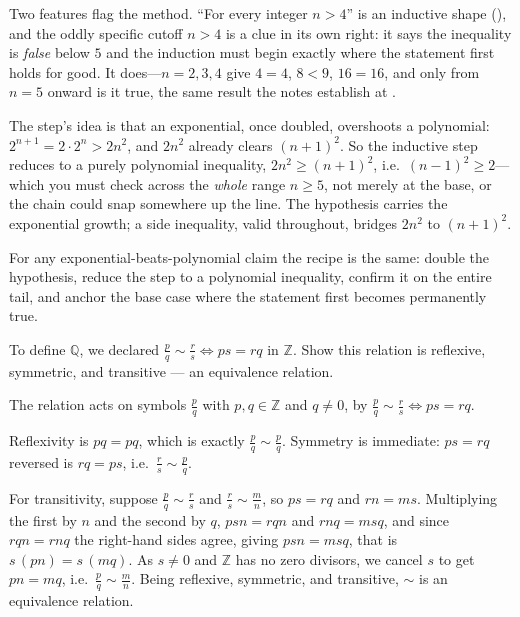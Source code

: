 \documentclass[main.tex]{subfiles}
\begin{document}
\begin{Reflection}
Two features flag the method. ``For every integer $n>4$'' is an inductive shape (), and
the oddly specific cutoff $n>4$ is a clue in its own right: it says the inequality is \emph{false}
below $5$ and the induction must begin exactly where the statement first holds for good. It
does---$n=2,3,4$ give $4=4$, $8<9$, $16=16$, and only from $n=5$ onward is it true, the same result the
notes establish at .

The step's idea is that an exponential, once doubled, overshoots a polynomial: $2^{n+1}=2\cdot
2^n>2n^2$, and $2n^2$ already clears $(n+1)^2$. So the inductive step reduces to a purely polynomial
inequality, $2n^2\ge(n+1)^2$, i.e.\ $(n-1)^2\ge 2$---which you must check across the \emph{whole} range
$n\ge 5$, not merely at the base, or the chain could snap somewhere up the line. The hypothesis carries
the exponential growth; a side inequality, valid throughout, bridges $2n^2$ to $(n+1)^2$.

For any exponential-beats-polynomial claim the recipe is the same: double the hypothesis, reduce the
step to a polynomial inequality, confirm it on the entire tail, and anchor the base case where the
statement first becomes permanently true.
\end{Reflection}

To define $\mathbb Q$, we declared $\frac pq\sim\frac rs\iff ps=rq$ in $\mathbb Z$. Show this relation
is reflexive, symmetric, and transitive --- an equivalence relation.

\begin{Solution}
The relation acts on symbols $\frac pq$ with $p,q\in\mathbb Z$ and $q\neq 0$, by $\frac pq\sim\frac
rs\iff ps=rq$.

Reflexivity is $pq=pq$, which is exactly $\frac pq\sim\frac pq$. Symmetry is immediate: $ps=rq$
reversed is $rq=ps$, i.e.\ $\frac rs\sim\frac pq$.

For transitivity, suppose $\frac pq\sim\frac rs$ and $\frac rs\sim\frac mn$, so $ps=rq$ and $rn=ms$.
Multiplying the first by $n$ and the second by $q$, $psn=rqn$ and $rnq=msq$, and since $rqn=rnq$ the
right-hand sides agree, giving $psn=msq$, that is $s\,(pn)=s\,(mq)$. As $s\neq 0$ and $\mathbb Z$ has
no zero divisors, we cancel $s$ to get $pn=mq$, i.e.\ $\frac pq\sim\frac mn$. Being reflexive,
symmetric, and transitive, $\sim$ is an equivalence relation.
\end{Solution}
\end{document}
